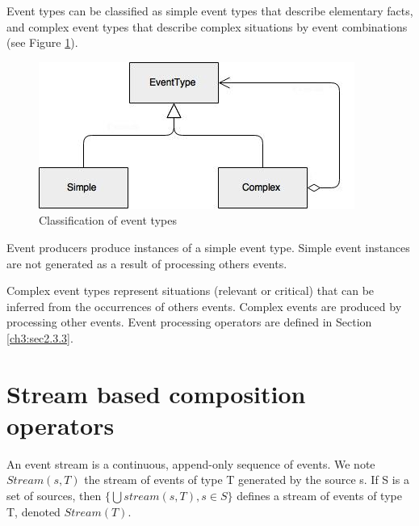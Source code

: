 Event types can be classified as simple event types that describe elementary facts, and complex event types that describe complex situations by event combinations (see Figure \ref{fig:eventtype}). 
\begin{figure}[H]
  \begin{center}
    \includegraphics[scale=0.5]{chap3/images/eventType.jpg}
  \end{center}
  \caption{Classification of event types}
  \label{fig:eventtype}
\end{figure}

Event producers produce instances of a simple event type. Simple event instances are not generated as a result of processing others events.

Complex event types represent situations (relevant or critical) that can be inferred from the occurrences of others events. Complex events are produced by processing other events. Event processing operators are defined in Section \ref{ch3:sec2.3.3}.
 
 \section{Stream based composition operators}
 \label{ch3:sec3}
 An event stream is a continuous, append-only sequence of events. We note $Stream(s, T)$ the stream of events of type T generated by the source s. If S is a set of sources, then $\{\bigcup  stream(s,T), s \in S\}$ defines a stream of events of type T, denoted $Stream(T)$.


